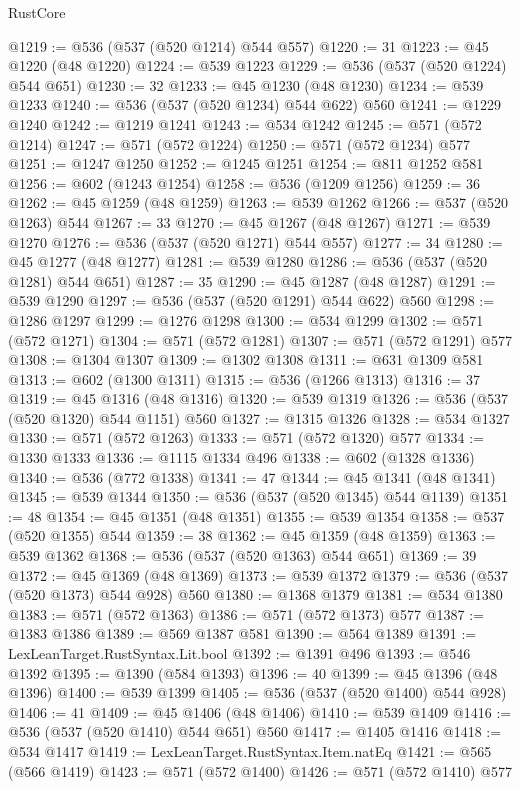 \begin{lexlean}{RustCore}
\begin{coremodule}
@1219 := @536 (@537 (@520 @1214) @544 @557)
@1220 := 31
@1223 := @45 @1220 (@48 @1220)
@1224 := @539 @1223
@1229 := @536 (@537 (@520 @1224) @544 @651)
@1230 := 32
@1233 := @45 @1230 (@48 @1230)
@1234 := @539 @1233
@1240 := @536 (@537 (@520 @1234) @544 @622) @560
@1241 := @1229 @1240
@1242 := @1219 @1241
@1243 := @534 @1242
@1245 := @571 (@572 @1214)
@1247 := @571 (@572 @1224)
@1250 := @571 (@572 @1234) @577
@1251 := @1247 @1250
@1252 := @1245 @1251
@1254 := @811 @1252 @581
@1256 := @602 (@1243 @1254)
@1258 := @536 (@1209 @1256)
@1259 := 36
@1262 := @45 @1259 (@48 @1259)
@1263 := @539 @1262
@1266 := @537 (@520 @1263) @544
@1267 := 33
@1270 := @45 @1267 (@48 @1267)
@1271 := @539 @1270
@1276 := @536 (@537 (@520 @1271) @544 @557)
@1277 := 34
@1280 := @45 @1277 (@48 @1277)
@1281 := @539 @1280
@1286 := @536 (@537 (@520 @1281) @544 @651)
@1287 := 35
@1290 := @45 @1287 (@48 @1287)
@1291 := @539 @1290
@1297 := @536 (@537 (@520 @1291) @544 @622) @560
@1298 := @1286 @1297
@1299 := @1276 @1298
@1300 := @534 @1299
@1302 := @571 (@572 @1271)
@1304 := @571 (@572 @1281)
@1307 := @571 (@572 @1291) @577
@1308 := @1304 @1307
@1309 := @1302 @1308
@1311 := @631 @1309 @581
@1313 := @602 (@1300 @1311)
@1315 := @536 (@1266 @1313)
@1316 := 37
@1319 := @45 @1316 (@48 @1316)
@1320 := @539 @1319
@1326 := @536 (@537 (@520 @1320) @544 @1151) @560
@1327 := @1315 @1326
@1328 := @534 @1327
@1330 := @571 (@572 @1263)
@1333 := @571 (@572 @1320) @577
@1334 := @1330 @1333
@1336 := @1115 @1334 @496
@1338 := @602 (@1328 @1336)
@1340 := @536 (@772 @1338)
@1341 := 47
@1344 := @45 @1341 (@48 @1341)
@1345 := @539 @1344
@1350 := @536 (@537 (@520 @1345) @544 @1139)
@1351 := 48
@1354 := @45 @1351 (@48 @1351)
@1355 := @539 @1354
@1358 := @537 (@520 @1355) @544
@1359 := 38
@1362 := @45 @1359 (@48 @1359)
@1363 := @539 @1362
@1368 := @536 (@537 (@520 @1363) @544 @651)
@1369 := 39
@1372 := @45 @1369 (@48 @1369)
@1373 := @539 @1372
@1379 := @536 (@537 (@520 @1373) @544 @928) @560
@1380 := @1368 @1379
@1381 := @534 @1380
@1383 := @571 (@572 @1363)
@1386 := @571 (@572 @1373) @577
@1387 := @1383 @1386
@1389 := @569 @1387 @581
@1390 := @564 @1389
@1391 := LexLeanTarget.RustSyntax.Lit.bool
@1392 := @1391 @496
@1393 := @546 @1392
@1395 := @1390 (@584 @1393)
@1396 := 40
@1399 := @45 @1396 (@48 @1396)
@1400 := @539 @1399
@1405 := @536 (@537 (@520 @1400) @544 @928)
@1406 := 41
@1409 := @45 @1406 (@48 @1406)
@1410 := @539 @1409
@1416 := @536 (@537 (@520 @1410) @544 @651) @560
@1417 := @1405 @1416
@1418 := @534 @1417
@1419 := LexLeanTarget.RustSyntax.Item.natEq
@1421 := @565 (@566 @1419)
@1423 := @571 (@572 @1400)
@1426 := @571 (@572 @1410) @577

\end{coremodule}
\end{lexlean}
